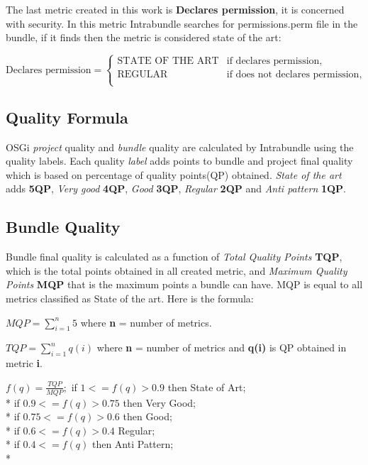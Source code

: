 The last metric created in this work is \textbf{Declares permission}, it is concerned with security. In this metric Intrabundle searches for permissions.perm file in the bundle, if it finds then the metric is considered state of the art: \newline


\(\text{Declares permission}=\begin{cases}
\text{STATE OF THE ART}& \text{if declares permission},\\
\text{REGULAR}& \text{if does not declares permission}, \\
\end{cases} \)  \newline

\subsection{Quality Formula}

OSGi \emph{project} quality and \emph{bundle} quality are calculated by Intrabundle using the quality labels. Each quality \emph{label} adds points to bundle and project final quality which is based on percentage of quality points(QP) obtained. \emph{State of the art} adds \textbf{5QP}, \emph{Very good} \textbf{4QP}, \emph{Good} \textbf{3QP}, \emph{Regular} \textbf{2QP} and \emph{Anti pattern} \textbf{1QP}. 

\subsection{Bundle Quality}
Bundle final quality is calculated as a function of \emph{Total Quality Points} \textbf{TQP}, which is the total points obtained in all created metric, and \emph{Maximum Quality Points} \textbf{MQP} that is the maximum points a bundle can have. MQP is equal to all metrics classified as State of the art. Here is the formula:\newline    

\(MQP = \sum_{i=1}^{n} 5 \) where \textbf{n} = number of metrics. \newline

\(TQP = \sum_{i=1}^{n} q(i) \) where \textbf{n} = number of metrics and \textbf{q(i)} is QP obtained in metric \textbf{i}. \newline

 
\(
f(q) = \frac{TQP}{MQP};
\)
\newline
\newline
 if \( 1 <= f(q) > 0.9 \) then State of Art; \\*
 if \( 0.9 <= f(q) > 0.75 \) then Very Good; \\*
 if \( 0.75 <= f(q) > 0.6 \) then Good; \\*
 if \( 0.6 <= f(q) > 0.4 \) Regular; \\*
 if \( 0.4 <= f(q) \) then Anti Pattern;\\*

